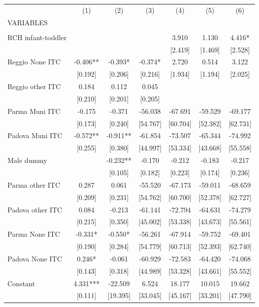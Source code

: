 \begin{tabular}{lcccccc} \hline
 & (1) & (2) & (3) & (4) & (5) & (6) \\
VARIABLES &  &  &  &  &  &  \\ \hline
 &  &  &  &  &  &  \\
RCH infant-toddler &  &  &  & 3.910 & 1.130 & 4.416* \\
 &  &  &  & [2.419] & [1.469] & [2.528] \\
Reggio None ITC & -0.406** & -0.393* & -0.374* & 2.720 & 0.514 & 3.122 \\
 & [0.192] & [0.206] & [0.216] & [1.934] & [1.194] & [2.025] \\
Reggio other ITC & 0.184 & 0.112 & 0.045 &  &  &  \\
 & [0.210] & [0.201] & [0.205] &  &  &  \\
Parma Muni ITC & -0.175 & -0.371 & -56.038 & -67.691 & -59.529 & -69.177 \\
 & [0.173] & [0.240] & [54.767] & [60.704] & [52.382] & [62.731] \\
Padova Muni ITC & -0.572** & -0.911** & -61.854 & -73.507 & -65.344 & -74.992 \\
 & [0.255] & [0.380] & [44.997] & [53.334] & [43.668] & [55.558] \\
Male dummy &  & -0.232** & -0.170 & -0.212 & -0.183 & -0.217 \\
 &  & [0.105] & [0.182] & [0.223] & [0.174] & [0.236] \\
Parma other ITC & 0.287 & 0.061 & -55.520 & -67.173 & -59.011 & -68.659 \\
 & [0.209] & [0.231] & [54.762] & [60.700] & [52.378] & [62.727] \\
Padova other ITC & 0.084 & -0.213 & -61.141 & -72.794 & -64.631 & -74.279 \\
 & [0.215] & [0.350] & [45.002] & [53.338] & [43.673] & [55.561] \\
Parma None ITC & -0.331* & -0.550* & -56.261 & -67.914 & -59.752 & -69.401 \\
 & [0.190] & [0.284] & [54.779] & [60.713] & [52.393] & [62.740] \\
Padova None ITC & 0.246* & -0.061 & -60.929 & -72.583 & -64.420 & -74.068 \\
 & [0.143] & [0.318] & [44.989] & [53.328] & [43.661] & [55.552] \\
Constant & 4.331*** & -22.509 & 6.524 & 18.177 & 10.015 & 19.662 \\
 & [0.111] & [19.395] & [33.045] & [45.167] & [33.201] & [47.790] \\

\end{tabular}

